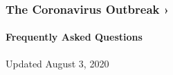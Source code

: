 \href{https://www.nytimes.com/news-event/coronavirus?action=click\&pgtype=Article\&state=default\&region=MAIN_CONTENT_3\&context=storylines_faq}{}

\hypertarget{the-coronavirus-outbreak-}{%
\subsubsection{The Coronavirus Outbreak
›}\label{the-coronavirus-outbreak-}}

\hypertarget{frequently-asked-questions}{%
\paragraph{Frequently Asked
Questions}\label{frequently-asked-questions}}

Updated August 3, 2020

